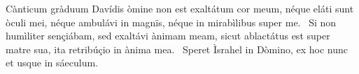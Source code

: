 { Cànticum gràduum Davídis}
{%
òmine non est exaltátum cor meum, néque eláti sunt òculi mei, néque ambulávi in magnïs, néque in mirabìlibus super me. 
~Si non humìliter sençiábam, sed exaltávi ànimam meam, sicut ablactátus est super matre sua, ita retribúçio in ànima mea. 
~Speret Ìsrahel in Dòmino, ex hoc nunc et usque in sáeculum. 
}

